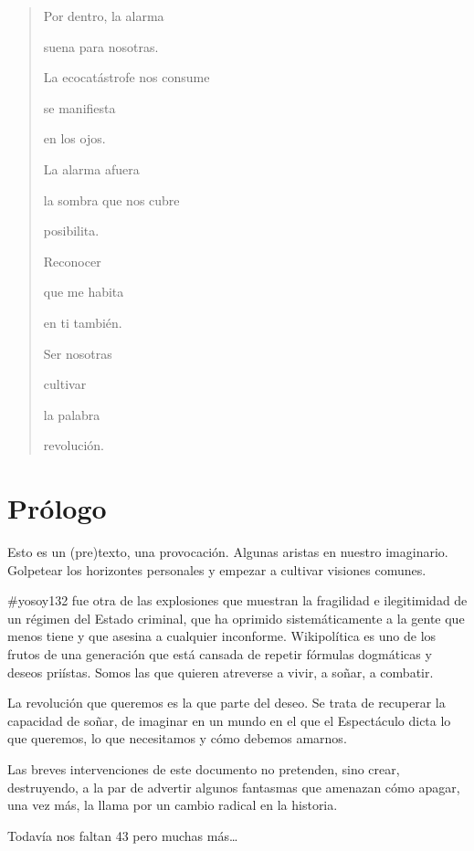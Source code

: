 \begin{verse}
    Por dentro, la alarma
    
    suena para nosotras.
    
    La ecocatástrofe nos consume
    
    se manifiesta
    
    en los ojos.
    
    La alarma afuera
    
    la sombra que nos cubre
    
    posibilita.
    
    Reconocer
    
    que me habita
    
    en ti también.
    
    Ser nosotras

        \hspace*{1cm}cultivar
        
        \hspace*{1cm}la palabra
        
        \hspace*{1cm}revolución.
        
\end{verse}


\hypertarget{prologue}{%
\section{Prólogo}\label{prologue}}

Esto es un (pre)texto, una provocación. Algunas aristas en nuestro
imaginario. Golpetear los horizontes personales y empezar a cultivar
visiones comunes.

\#yosoy132 fue otra de las explosiones que muestran la fragilidad e
ilegitimidad de un régimen del Estado criminal, que ha oprimido
sistemáticamente a la gente que menos tiene y que asesina a cualquier
inconforme. Wikipolítica es uno de los frutos de una generación que está
cansada de repetir fórmulas dogmáticas y deseos priístas. Somos las que
quieren atreverse a vivir, a soñar, a combatir.

La revolución que queremos es la que parte del deseo. Se trata de
recuperar la capacidad de soñar, de imaginar en un mundo en el que el
Espectáculo dicta lo que queremos, lo que necesitamos y cómo debemos
amarnos.

Las breves intervenciones de este documento no pretenden, sino crear,
destruyendo, a la par de advertir algunos fantasmas que amenazan cómo
apagar, una vez más, la llama por un cambio radical en la historia.

Todavía nos faltan 43 pero muchas más\ldots{}
